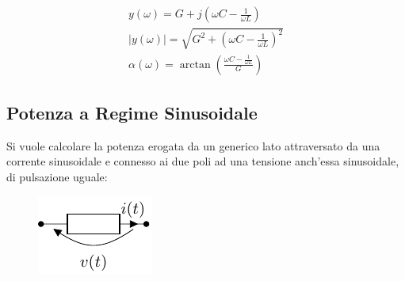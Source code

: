\documentclass{article}
\numberwithin{equation}{subsection}
\begin{document}
\begin{gather*}
    y(\omega)=G+j\displaystyle\left(\omega C-\frac{1}{\omega L}\right)\\
    |y(\omega)|=\displaystyle\sqrt{G^2+\left(\omega C-\frac{1}{\omega L}\right)^2}\\
    \alpha(\omega)=\arctan\left(\displaystyle\frac{\displaystyle\omega C-\frac{1}{\omega L}}{G}\right)
\end{gather*}

\subsection{Potenza a Regime Sinusoidale}

Si vuole calcolare la potenza erogata da un generico lato attraversato da una corrente sinusoidale e connesso ai due poli ad una tensione anch'essa sinusoidale, di pulsazione 
uguale:
\begin{figure}[H]%
    \centering
    \includegraphics{generico-fasori.pdf}
    \label{fig:generico-fasori}
\end{figure}
\end{document}
